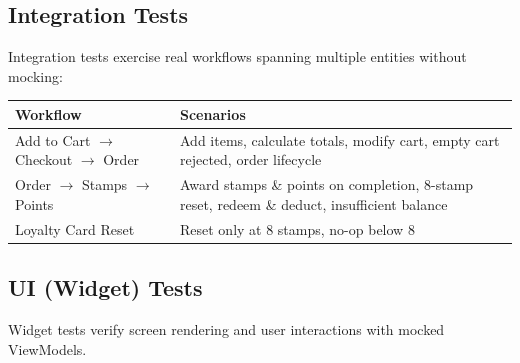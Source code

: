 \subsection{Integration Tests}

Integration tests exercise real workflows spanning multiple entities without mocking:

\setlength{\LTleft}{0pt}\setlength{\LTright}{0pt}
\begin{longtable}{|p{6.5cm}|p{9.5cm}|}
  \hline
  \textbf{Workflow} & \textbf{Scenarios} \\
  \hline

  Add to Cart $\rightarrow$ Checkout $\rightarrow$ Order &
    Add items, calculate totals, modify cart, empty cart rejected, order lifecycle \\
  \hline

  Order $\rightarrow$ Stamps $\rightarrow$ Points &
    Award stamps \& points on completion, 8-stamp reset, redeem \& deduct, insufficient balance \\
  \hline

  Loyalty Card Reset &
    Reset only at 8 stamps, no-op below 8 \\

  \hline
\end{longtable}

\subsection{UI (Widget) Tests}

Widget tests verify screen rendering and user interactions with mocked ViewModels.

